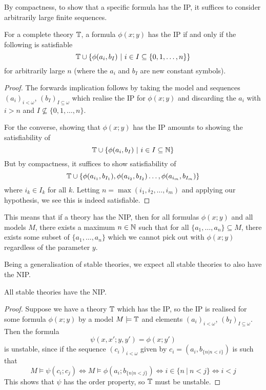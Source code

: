 By compactness, to show that a specific formula has the IP, it suffices to consider arbitrarily
large finite sequences.

\begin{prop}
  For a complete theory $\mathbb{T}$, a formula $\phi(x;y)$ has the IP if and only if the following
  is satisfiable
  \begin{equation*}
    \mathbb{T} \cup \{\phi(a_i,b_I)\ |\ i \in I \subseteq \{0,1,\dots,n\}\}
  \end{equation*}
  for arbitrarily large $n$ (where the $a_i$ and $b_I$ are new constant symbols).
\end{prop}
\begin{proof}
  The forwards implication follows by taking the model and sequences $(a_i)_{i<\omega}$,
  $(b_I)_{I \subseteq \omega}$ which realise the IP for $\phi(x;y)$ and discarding the
  $a_i$ with $i > n$ and $I \nsubseteq \{0,1,\dots,n\}$.

  For the converse, showing that $\phi(x;y)$ has the IP amounts to showing
  the satisfiability of
  \begin{equation*}
    \mathbb{T} \cup \{\phi(a_i,b_I)\ |\ i \in I \subseteq \mathbb{N} \}
  \end{equation*}
  But by compactness, it suffices to show satisfiability of
  \begin{equation*}
    \mathbb{T} \cup \{\phi(a_{i_1},b_{I_1}), \phi(a_{i_2},b_{I_2}) \dots, \phi(a_{i_m},b_{I_m})\}
  \end{equation*}
  where $i_k \in I_k$ for all $k$. Letting $n = \max(i_1,i_2,\dots,i_m)$ and applying our
  hypothesis, we see this is indeed satisfiable.
\end{proof}

This means that if a theory has the NIP, then for all formulas $\phi(x;y)$ and all models $M$,
there exists a maximum $n \in \mathbb{N}$ such that for all $\{a_1, \dots, a_n\} \subseteq M$, there exists
some subset of $\{a_1, \dots, a_n\}$ which we cannot pick out with $\phi(x;y)$ regardless of the
parameter $y$.

Being a generalisation of stable theories, we expect all stable theories to also have the NIP.

\begin{prop}
  All stable theories have the NIP.
\end{prop}
\begin{proof}
  Suppose we have a theory $\mathbb{T}$ which has the IP, so the IP is realised for some formula
  $\phi(x;y)$ by a model $M \models \mathbb{T}$ and elements $(a_i)_{i<\omega}$,
  $(b_I)_{I \subseteq \omega}$. Then the formula
  \begin{equation*}
    \psi(x,x';y,y') = \phi(x;y')
  \end{equation*}
  is unstable, since if the sequence $(c_i)_{i<\omega}$ given by $c_i=(a_i,b_{\{n | n < i\}})$ is
  such that
  \begin{equation*}
    M \models \psi(c_i;c_j) \iff
      M \models \phi(a_i; b_{\{n|n < j\}}) \iff
      i \in \{n\ |\ n < j\} \iff
      i < j
  \end{equation*}
  This shows that $\psi$ has the order property, so $\mathbb{T}$ must be unstable.
\end{proof}

